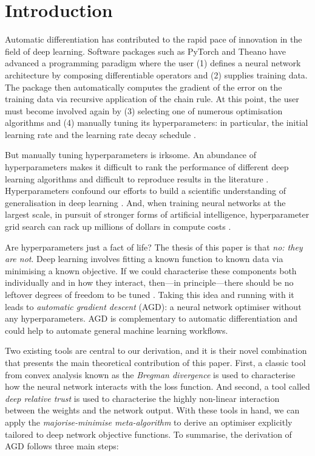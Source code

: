 \section{Introduction}

Automatic differentiation has contributed to the rapid pace of innovation in the field of deep learning. Software packages such as PyTorch \citep{pytorch} and Theano \citep{theano} have advanced a programming paradigm where the user (1) defines a neural network architecture by composing differentiable operators and (2) supplies training data. The package then automatically computes the gradient of the error on the training data via recursive application of the chain rule. At this point, the user must become involved again by (3) selecting one of numerous optimisation algorithms and (4) manually tuning its hyperparameters: in particular, the initial learning rate and the learning rate decay schedule \citep{Goodfellow-et-al-2016}.

But manually tuning hyperparameters is irksome. An abundance of hyperparameters makes it difficult to rank the performance of different deep learning algorithms \citep{Lucic2017AreGC,crowded_valley} and difficult to reproduce results in the literature \citep{deeprlmatters}. Hyperparameters confound our efforts to build a scientific understanding of generalisation in deep learning \citep{jiang2019fantastic, my-margin}. And, when training neural networks at the largest scale, in pursuit of stronger forms of artificial intelligence, hyperparameter grid search can rack up millions of dollars in compute costs \citep{Sharir2020TheCO}. 

Are hyperparameters just a fact of life? The thesis of this paper is that \textit{no: they are not}. Deep learning involves fitting a known function to known data via minimising a known objective. If we could characterise these components both individually and in how they interact, then---in principle---there should be no leftover degrees of freedom to be tuned \citep{tutorial}. Taking this idea and running with it leads to \textit{automatic gradient descent} (AGD): a neural network optimiser without any hyperparameters. AGD is complementary to automatic differentiation and could help to automate general machine learning workflows.

Two existing tools are central to our derivation, and it is their novel combination that presents the main theoretical contribution of this paper. First, a classic tool from convex analysis known as the \textit{Bregman divergence} \citep{bregman1967relaxation,bregman} is used to characterise how the neural network interacts with the loss function. And second, a tool called \textit{deep relative trust} \citep{my-fromage} is used to characterise the highly non-linear interaction between the weights and the network output. With these tools in hand, we can apply the \textit{majorise-minimise meta-algorithm} \citep{mm} to derive an optimiser explicitly tailored to deep network objective functions. To summarise, the derivation of AGD follows three main steps:


